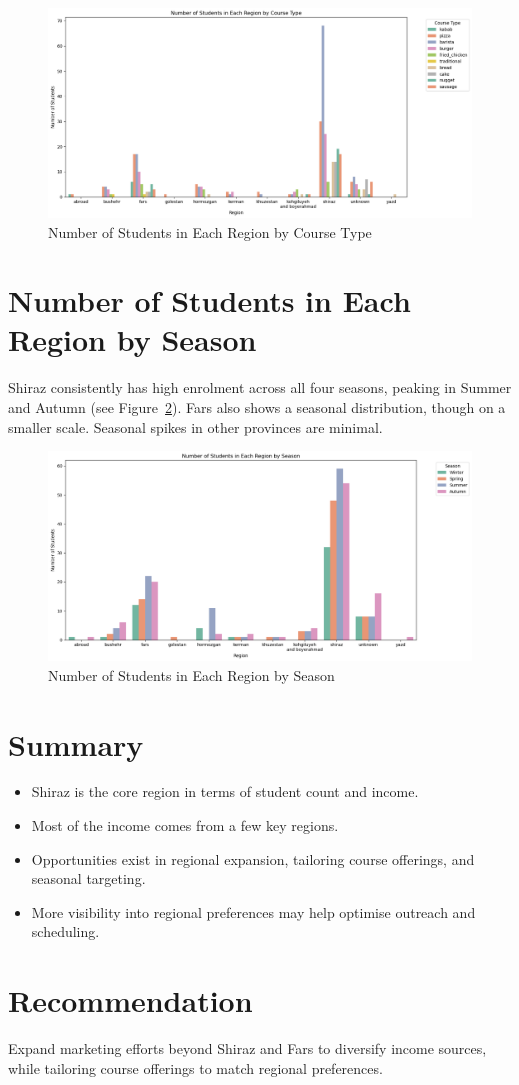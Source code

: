 \documentclass[12pt,a4paper]{article}
\begin{document}
\begin{figure}[h!]
    \centering
    \includegraphics[width=1\textwidth]{Number of Students in Each Region by Course Type.png}
    \caption{Number of Students in Each Region by Course Type}
    \label{fig:region-course}
\end{figure}

\section{Number of Students in Each Region by Season}
Shiraz consistently has high enrolment across all four seasons, peaking in Summer and Autumn (see Figure~\ref{fig:region-season}). Fars also shows a seasonal distribution, though on a smaller scale. Seasonal spikes in other provinces are minimal.

\begin{figure}[h!]
    \centering
    \includegraphics[width=1\textwidth]{Number of Students in Each Region by Season.png}
    \caption{Number of Students in Each Region by Season}
    \label{fig:region-season}
\end{figure}

\section*{Summary}
\begin{itemize}
    \item Shiraz is the core region in terms of student count and income.
    \item Most of the income comes from a few key regions.
    \item Opportunities exist in regional expansion, tailoring course offerings, and seasonal targeting.
    \item More visibility into regional preferences may help optimise outreach and scheduling.
\end{itemize}

\newpage
\section*{Recommendation} Expand marketing efforts beyond Shiraz and Fars to diversify income sources, while tailoring course offerings to match regional preferences.
\end{document}
